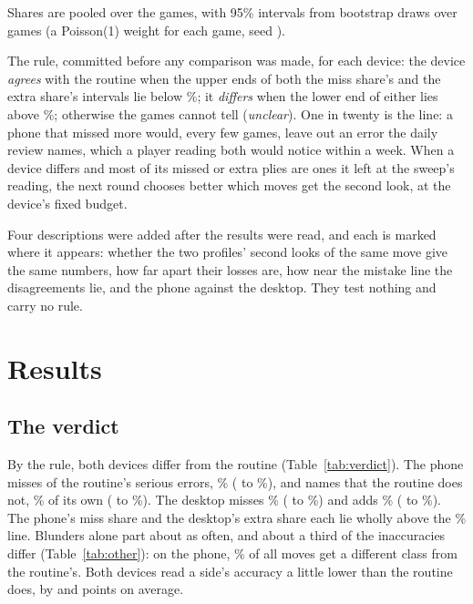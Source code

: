 \documentclass[11pt]{article}
\begin{document}
Shares are pooled over the \Cases{} games, with 95\% intervals from \Draws{} bootstrap draws over
games (a Poisson(1) weight for each game, seed \Seed).

The rule, committed before any comparison was made, for each device: the device \emph{agrees} with
the routine when the upper ends of both the miss share's and the extra share's intervals lie below
\Line\%; it \emph{differs} when the lower end of either lies above \Line\%; otherwise the games
cannot tell (\emph{unclear}). One in twenty is the line: a phone that missed more would, every few
games, leave out an error the daily review names, which a player reading both would notice within a
week. When a device differs and most of its missed or extra plies are ones it left at the sweep's
reading, the next round chooses better which moves get the second look, at the device's fixed
budget.

Four descriptions were added after the results were read, and each is marked where it appears:
whether the two profiles' second looks of the same move give the same numbers, how far apart their
losses are, how near the mistake line the disagreements lie, and the phone against the desktop. They
test nothing and carry no rule.

\section{Results}

\subsection{The verdict}

By the rule, both devices differ from the routine (Table~\ref{tab:verdict}). The phone misses
\PhoneMissed{} of the routine's \PhoneRoutineSerious{} serious errors, \PhoneMiss\%
(\PhoneMissLo{} to \PhoneMissHi\%), and names \PhoneExtra{} that the routine does not,
\PhoneExtraShare\% of its own (\PhoneExtraLo{} to \PhoneExtraHi\%). The desktop misses
\DesktopMiss\% (\DesktopMissLo{} to \DesktopMissHi\%) and adds \DesktopExtraShare\%
(\DesktopExtraLo{} to \DesktopExtraHi\%). The phone's miss share and the desktop's extra share each
lie wholly above the \Line\% line. Blunders alone part about as often, and about a third of the
inaccuracies differ (Table~\ref{tab:other}): on the phone, \PhoneDiffer\% of all moves get a
different class from the routine's. Both devices read a side's accuracy a little lower than the
routine does, by \PhoneBiasAbs{} and \DesktopBiasAbs{} points on average.
\end{document}
